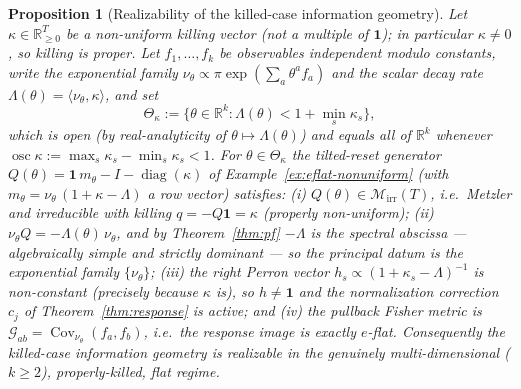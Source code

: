 \documentclass[11pt,reqno]{amsart}
\theoremstyle{plain}
\newtheorem{proposition}[theorem]{Proposition}
\theoremstyle{definition}
\theoremstyle{remark}
\newcommand{\R}{\mathbb{R}}
\newcommand{\one}{\mathbf{1}}
\DeclareMathOperator{\diag}{diag}
\begin{document}
\begin{proposition}[Realizability of the killed-case information geometry]\label{prop:eflat-nonuniform}
Let $\kappa\in\R^{T}_{\ge0}$ be a \emph{non-uniform} killing vector (not a multiple of $\one$); in
particular $\kappa\neq0$, so killing is proper. Let $f_1,\dots,f_k$ be observables independent modulo
constants, write the exponential family $\nu_\theta\propto\pi\exp(\sum_a\theta^af_a)$ and the scalar
decay rate $\Lambda(\theta)=\langle\nu_\theta,\kappa\rangle$, and set
\[
\Theta_\kappa:=\bigl\{\theta\in\R^k:\Lambda(\theta)<1+\textstyle\min_s\kappa_s\bigr\},
\]
which is \emph{open} (by real-analyticity of $\theta\mapsto\Lambda(\theta)$) and equals all of $\R^k$
whenever $\operatorname{osc}\kappa:=\max_s\kappa_s-\min_s\kappa_s<1$. For $\theta\in\Theta_\kappa$ the
tilted-reset generator $Q(\theta)=\one\,m_\theta-I-\diag(\kappa)$ of
Example~\ref{ex:eflat-nonuniform} \textup{(}with $m_\theta=\nu_\theta\,(1+\kappa-\Lambda)$ a row
vector\textup{)} satisfies:
\textup{(i)} $Q(\theta)\in\mathcal M_{\mathrm{irr}}(T)$, i.e.\ Metzler and irreducible with killing
$q=-Q\one=\kappa$ (properly non-uniform); \textup{(ii)} $\nu_\theta Q=-\Lambda(\theta)\,\nu_\theta$, and
by Theorem~\ref{thm:pf} $-\Lambda$ is the spectral abscissa --- algebraically simple and strictly
dominant --- so the principal datum is the exponential family $\{\nu_\theta\}$; \textup{(iii)} the right
Perron vector $h_s\propto(1+\kappa_s-\Lambda)^{-1}$ is non-constant (precisely because $\kappa$ is), so
$h\neq\one$ and the normalization correction $c_j$ of Theorem~\ref{thm:response} is active; and
\textup{(iv)} the pullback Fisher metric is $\mathcal G_{ab}=\operatorname{Cov}_{\nu_\theta}(f_a,f_b)$,
i.e.\ the response image is exactly $e$-flat. Consequently the killed-case information geometry is
realizable in the genuinely multi-dimensional ($k\ge2$), properly-killed, flat regime.
\end{proposition}
\end{document}
